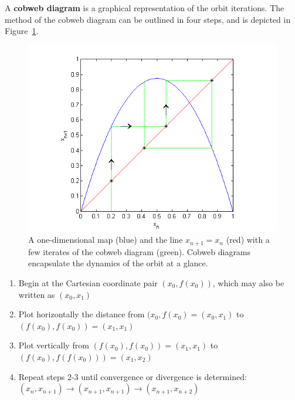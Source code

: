 A \textbf{cobweb diagram} is a graphical representation of the orbit
iterations. The method of the cobweb diagram can be outlined in four
steps, and is depicted in Figure~\ref{fig:cobex}.
\begin{figure}[!h]
\caption[Example of a Cobweb Diagram]{A one-dimensional map (blue) and
  the line $x_{n+1}=x_n$ (red) with a few iterates of the cobweb
  diagram (green). Cobweb diagrams encapsulate the dynamics of the orbit at a glance.}\label{fig:cobex}
    \begin{center}
	\includegraphics[scale=0.8]{figs/cobweb_ex.png}
    \end{center}
\end{figure}

\begin{enumerate}
\item Begin at the Cartesian coordinate pair $(x_0, f(x_0))$, which
  may also be written as $(x_0, x_1)$
\item Plot horizontally the distance from $(x_0, f(x_0)=(x_0, x_1)$ to $(f(x_0),
  f(x_0))=(x_1, x_1)$
\item Plot vertically from $(f(x_0), f(x_0))=(x_1, x_1)$ to $(f(x_0), f(f(x_0)))=(x_1, x_2)$
\item Repeat steps 2-3 until convergence or divergence is determined:
  $(x_n, x_{n+1}) \to (x_{n+1}, x_{n+1}) \to (x_{n+1},x_{n+2})$
\end{enumerate}

